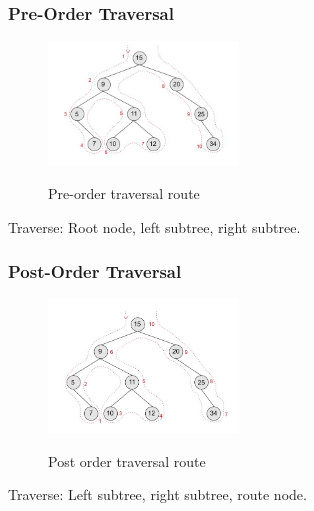 \documentclass[a4paper,11pt, twocolumn]{article}
\begin{document}
\subsubsection{Pre-Order Traversal}
\begin{figure}[H]
    \centering
    \includegraphics[width=0.45\textwidth]{treePreOrder.jpg}
    \label{fig:treePreOrder}
    \caption{Pre-order traversal route}
\end{figure}
\noindent Traverse: Root node, left subtree, right subtree.
\subsubsection{Post-Order Traversal}
\begin{figure}[H]
    \centering
    \includegraphics[width=0.45\textwidth]{treePostOrder.jpg}
    \label{fig:treePostOrder}
    \caption{Post order traversal route}
\end{figure}
\noindent Traverse: Left subtree, right subtree, route node.
\end{document}
